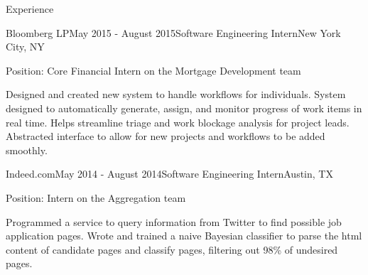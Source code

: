 \documentclass{resume} %
\begin{document}
\begin{rSection}{Experience}
  \begin{rSubsection}{Bloomberg LP}{May 2015 - August 2015}{Software Engineering Intern}{New York City, NY}
  \item Position: Core Financial Intern on the Mortgage Development team
  \item Designed and created new system to handle workflows for individuals.
      System designed to automatically generate, assign, and monitor progress of
      work items in real time. Helps streamline triage and work blockage
      analysis for project leads. Abstracted interface to allow for new projects
      and workflows to be added smoothly. 
\end{rSubsection}


\begin{rSubsection}{Indeed.com}{May 2014 - August 2014}{Software Engineering Intern}{Austin, TX}
\item Position: Intern on the Aggregation team
\item Programmed a service to query information from Twitter to find possible
    job application pages. Wrote and trained a naive Bayesian classifier to
    parse the html content of candidate pages and classify pages, filtering out
    98\% of undesired pages. 
\end{rSubsection}

\end{rSection}
\end{document}
